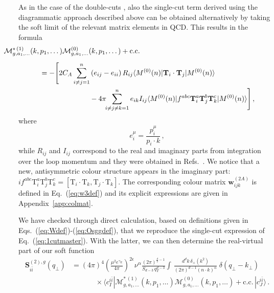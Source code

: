 \documentclass[a4paper,11pt]{article}
\newcommand{\bfS}{\bm{S}}
\def\cT{\bm{\mathrm{T}}}
\def\cm{\mathcal{M}}
\numberwithin{equation}{section}
\begin{document}
As in the case of the double-cuts , also the single-cut term derived
using the diagrammatic approach described above can be obtained alternatively by
taking the soft limit of the relevant matrix elements in QCD. This results
in the formula~\cite{Bierenbaum:2011gg}
%
\begin{align}
  &
  \hspace{-50pt}
  \cm^{*\, (1)}_{g ,a_1,\dots}(k,p_1,\dots)
  \cm^{(0)}_{g ,a_1,\dots}(k,p_1,\dots) + \text{c.c.}
  \nonumber \\[0.5em]
  & = - 
  \Bigg[ 
    2C_A\sum_{i\neq j = 1}^n
    \left(e_{ij}-e_{ii}\right) R_{ij}\langle M^{(0)}(n) 
    \vert \cT_i\cdot \cT_j \vert
    M^{(0)}(n)  \rangle  
    \nonumber \\
    & \hspace{70pt}
    -  4\pi\!\!\sum_{i\neq j\neq k = 1}^n e_{ik}I_{ij} \langle
    M^{(0)}(n)\vert  f^{abc} \cT_i^a \cT_j^b \cT_k^c \vert M^{(0)}(n)  \rangle
  \Bigg]\,,
  \label{eq:1cutmaster}
\end{align}
%
where
%
\begin{equation}
  \label{eq:eikprop}
  e_i^\mu = \frac{p_i^\mu}{p_i \cdot k}\,,
\end{equation}
%
while $ R_{ij}$ and $I_{ij}$ correspond to the real and imaginary parts
from integration over the loop momentum and they were obtained in
Refs.~\cite{Bierenbaum:2011gg, Czakon:2018iev}.  We notice that a new,
antisymmetric colour structure appears in the imaginary part:
$if^{abc} \cT_i^a \cT_j^b \cT_k^c  = [\cT_i \cdot \cT_k, \cT_j \cdot \cT_k]$.
%
The corresponding colour matrix $\bm{w}_{ijk}^{(2A)}$ is defined in
Eq.~(\ref{eq:w3def}) and its explicit expressions are given in
Appendix~\ref{app:colmat}.

We have checked through direct calculation, based on definitions given in
Eqs.~(\ref{eq:Wdef})-(\ref{eq:Osggdef}), that we reproduce the single-cut
expression of Eq.~(\ref{eq:1cutmaster}). With the latter, we can then
determine the real-virtual part of our soft function
%
\begin{align}
  \bfS_{i\bar i}^{(2), g} (q_\perp) & = 
   (4\pi)^4
  \left(\frac{\mu^2 e^{\gamma_E}}{4\pi}\right)^{2\epsilon}
  \!\!\!\!\nu^{\alpha}
  \frac{(2\pi)^{\frac{d}{2}-1}}{ S_{d-3}\,q_T^{d-3}}
  \int \! \, \frac{d^d k \,\delta_+(k^2) }{(2\pi)^{d-1} (n\cdot k)^\alpha} 
   \; \delta(q_\perp-k_\perp)\,
  \nonumber \\
  &
  \hspace{40pt}
  \times
  \langle c_I^{i\bar i} | 
  \cm^{*\, (1)}_{g ,a_1,\dots}(k,p_1,\dots)
  \cm^{(0)}_{g ,a_1,\dots}(k,p_1,\dots) + \text{c.c.}\,
  |c_J^{i\bar i} \rangle\,.
  \label{eq:S2cutfromM21cut}
\end{align}
%
\end{document}
